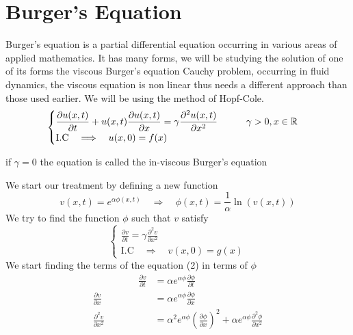 \section{Burger's Equation}
Burger's equation  is a partial differential equation occurring in various areas of applied mathematics. 
It has many forms, we will be studying the solution of one of its forms
the viscous Burger's equation Cauchy problem, occurring in fluid dynamics, 
the viscous equation is non linear thus needs a different approach than those used earlier. 
We will be using the method of Hopf-Cole.
\begin{equation}
    \begin{cases}
        \displaystyle \frac{\partial u(x,t)}{\partial t} + u(x,t)\frac{\partial u(x,t)}{\partial x} = \gamma \frac{\partial^2 u(x,t)}{\partial x^2} \quad\quad\quad \gamma > 0 , x \in \mathbb{R}
        \\
        \text{I.C} \quad \Longrightarrow \quad u(x,0) = f(x)
    \end{cases}
\end{equation}
\begin{enrichment*}{}
    if $\gamma = 0$ the equation is called the in-viscous Burger's equation
\end{enrichment*}
We start our treatment by defining a new function
\[
v(x,t) = e^{\alpha\phi(x,t)}  \quad \Longrightarrow \quad \phi(x,t) = \frac{1}{\alpha}\ln(v(x,t))
\]
We try to find the function $\phi$ such that $v$ satisfy
\begin{equation}
    \begin{cases}
        \displaystyle \frac{\partial v}{\partial t} = \gamma \frac{\partial^2 v}{\partial x^2}
        \\
        \text{I.C} \quad \Longrightarrow \quad v(x,0) = g(x)
    \end{cases}
\end{equation}
We start finding the terms of the equation (2) in terms of $\phi$
\begin{align*}
\hspace{2cm}
\frac{\partial v}{\partial t} &= \alpha e^{\alpha\phi} \frac{\partial \phi}{\partial t}
\\
\frac{\partial v}{\partial x} &= \alpha e^{\alpha\phi} \frac{\partial \phi}{\partial x} 
\\
\frac{\partial^2 v}{\partial x^2} &= \alpha^2 e^{\alpha \phi} {\left(\frac{\partial \phi}{\partial x}\right)}^2 + \alpha e^{\alpha\phi} \frac{\partial^2 \phi}{\partial x^2}
\end{align*}
